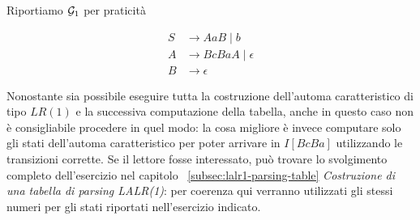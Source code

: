 \documentclass[class=book, crop=false, oneside, 12pt]{standalone}
\begin{document}
Riportiamo \(\mathcal{G}_1\) per praticità

\begin{align*}
    S &\to AaB \mid b \\
    A &\to BcBaA \mid \epsilon \\
    B &\to \epsilon
\end{align*}

Nonostante sia possibile eseguire tutta la costruzione dell'automa caratteristico di tipo \(LR(1)\) e la successiva computazione della tabella, anche in questo caso non è consigliabile procedere in quel modo: la cosa migliore è invece computare solo gli stati dell'automa caratteristico per poter arrivare in \(I[BcBa]\) utilizzando le transizioni corrette. Se il lettore fosse interessato, può trovare lo svolgimento completo dell'esercizio nel capitolo ~\ref{subsec:lalr1-parsing-table} \emph{Costruzione di una tabella di parsing LALR(1)}: per coerenza qui verranno utilizzati gli stessi numeri per gli stati riportati nell'esercizio indicato. 
\end{document}
